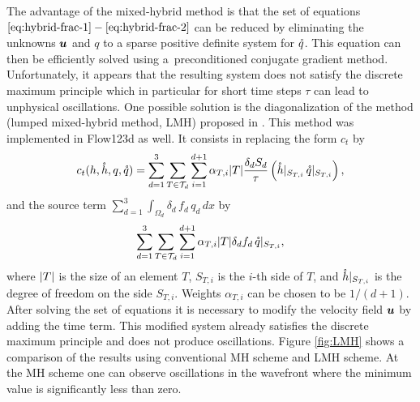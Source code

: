 The advantage of the mixed-hybrid method is that the set of equations $\eqref{eq:hybrid-frac-1} - 
\eqref{eq:hybrid-frac-2}$ can be reduced by eliminating the unknowns $\mathbf{\boldsymbol{u}}$ and $q$
to a sparse positive definite system for $\mathring q$.
This equation can then be efficiently solved using a~preconditioned conjugate gradient method.
Unfortunately, it appears that the resulting system does not satisfy the discrete maximum principle
 which in particular for short time steps $\tau$ can lead to unphysical oscillations.
One possible solution is the diagonalization of the method (lumped mixed-hybrid method, LMH)
 proposed in \cite{younes_2006}.
This method was implemented in Flow123d as well.
It consists in replacing the form $c_t$ by
\[
    c_t(h, \mathring h, q, \mathring q)= \sum_{d=1}^{3}\sum_{T\in \mathcal T_d}
        \sum_{i=1}^{d+1} \alpha_{T,i} \lvert T\rvert \frac{\delta_d S_d}{\tau} 
        \left(\mathring h|_{S_{T,i}}\,  \mathring q|_{S_{T,i}}\right),
\]
and the source term $\sum_{d=1}^{3}\int_{\Omega_d} \delta_{d}\,f_d\,q_{d}\,dx$ by
\[
    \sum_{d=1}^{3}\sum_{T\in \mathcal T_d}
        \sum_{i=1}^{d+1} \alpha_{T,i} \lvert T\rvert \delta_d f_d\,
        \mathring q|_{S_{T,i}},
\]
where $\lvert T\rvert$ is the size of an element $T$, $S_{T,i}$ is the $i$-th side of $T$, and 
$\mathring h|_{S_{T,i}}$ is the degree of freedom on the side $S_{T,i}$. 
Weights $\alpha_{T,i}$ can be chosen to be $1/(d+1)$. 
After solving the set of equations it is necessary to modify the velocity field $\mathbf{\boldsymbol{u}}$
 by adding the time term.
This modified system already satisfies the discrete maximum principle
 and does not produce oscillations.
Figure \ref{fig:LMH} shows a comparison of the results
 using conventional MH scheme and LMH scheme.
At the MH scheme one can observe oscillations in the wavefront
 where the minimum value is significantly less than zero.

